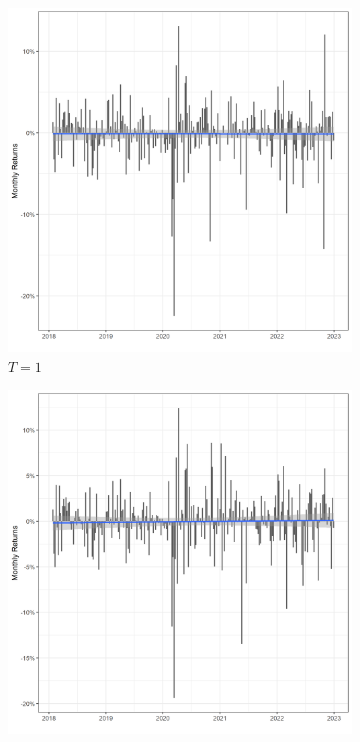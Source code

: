 \begin{figure}
        \label{fig:three graphs}
\end{figure}


\begin{figure}
     \centering
     \caption{Long run portfolio returns from negative events}
     \begin{subfigure}[b]{0.49\textwidth}
         \centering
         \includegraphics[width=\textwidth]{Projekt/1.Figures analysis/LT_negative_returns_1.png}
         \caption{$T = 1$}
         \label{fig:y equals x}
     \end{subfigure}
     \hfill
     \begin{subfigure}[b]{0.49\textwidth}
         \centering
         \includegraphics[width=\textwidth]{Projekt/1.Figures analysis/LT_negative_returns_3.png}

\end{subfigure}
\end{figure}
